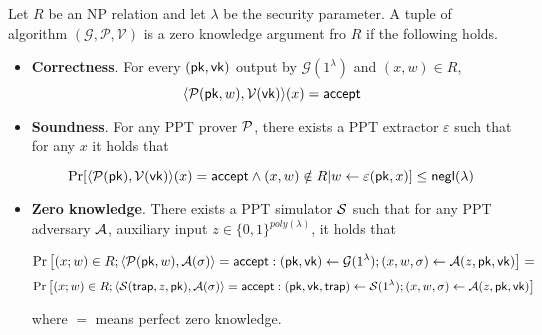 \begin{definition}\label{def::zkp}
	
	Let $R$ be an NP relation and let $\lambda$ be the security parameter. A tuple of algorithm $(\mathcal{G}, \mathcal{P}, \mathcal{V})$ is a zero knowledge argument fro $R$ if the following holds.
	
	\begin{itemize}
		
		\item \textbf{Correctness}. For every $(\pk, \vk)$ output by $\mathcal{G}(1^\lambda)$ and $(x, w) \in R$, 
		$$\langle \P(\pk, w), \V(\vk) \rangle(x) = \accept$$
		
		\item \textbf{Soundness}. For any PPT prover $\P$, there exists a PPT extractor $\varepsilon$ such that for any $x$ it holds that
		
		$$\Pr[\langle\P(\pk), \V(\vk) \rangle(x) = \accept \wedge (x, w) \notin R | w \leftarrow \varepsilon(\pk, x)] \leq \neg(\lambda)$$
		
		\item \textbf{Zero knowledge}. There exists a PPT simulator $\S$ such that for any PPT adversary $\A$, auxiliary input $z \in \{0, 1\}^{poly(\lambda)}$, it holds that
		
		$$\Pr\left[(x;w)\in R; \langle\P(\pk,w),\A(\sigma) \rangle=\accept: (\pk,\vk)\leftarrow\mathcal{G}(1^\lambda); (x,w,\sigma)\leftarrow\A(z,\pk,\vk) \right] = $$
		$$\Pr\left[(x;w)\in R; \langle\S(\mathsf{trap}, z, \pk),\A(\sigma) \rangle=\accept:(\pk,\vk,\mathsf{trap})\leftarrow\S(1^\lambda); (x,w,\sigma)\leftarrow\A(z,\pk,\vk)\right]$$
		
		where $=$ means perfect zero knowledge. 
		
	\end{itemize}
	
\end{definition}



